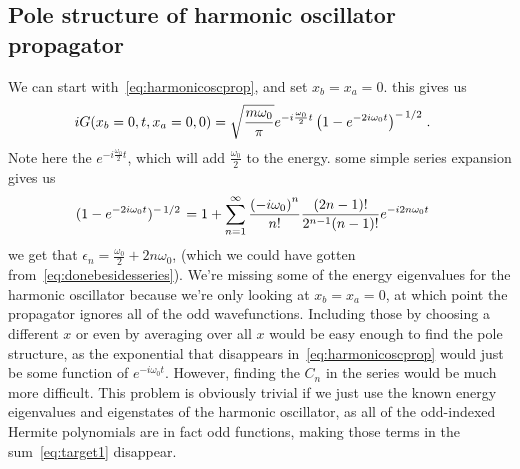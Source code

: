 \documentclass{article}
\begin{document}
	\subsection{Pole structure of harmonic oscillator propagator} \label{subsec:sol2}
	We can start with~\eqref{eq:harmonicoscprop}, and set $x_b = x_a = 0$.
	\triv this gives us
	\begin{align}
		i G(x_b = 0, t, x_a = 0, 0) &= \sqrt{\frac{m \omega_0}{\pi}} e^{-i\frac{\omega_0}{2} t}\left(1 - e^{- 2 i \omega_0 t}\right)^{-\flatfrac12}. \label{eq:donebesidesseries}
	\end{align}
	Note here the $e^{-i\frac{\omega_0}{2} t}$, which will add $\frac{\omega_0}{2}$ to the energy.
	\triv some simple series expansion gives us
	\begin{align}
		(1 - e^{- 2 i \omega_0 t})^{-\flatfrac12} &= 1 + \sum_{n = 1}^\infty \frac{ \left(- i \omega_0 \right)^n }{n{!}} \frac{(2n - 1){!}}{2^{n - 1}(n - 1){!}}e^{- i 2 n \omega_0 t}
	\end{align}
	\thrf we get that $\epsilon_n = \frac{\omega_0}{2} + 2 n \omega_0$, (which we could have gotten from~\eqref{eq:donebesidesseries}).
	We're missing some of the energy eigenvalues for the harmonic oscillator because we're only looking at $x_b = x_a = 0$, at which point the propagator ignores all of the odd wavefunctions.
	Including those by choosing a different $x$ or even by averaging over all $x$ would be easy enough to find the pole structure, as the exponential that disappears in~\eqref{eq:harmonicoscprop} would just be some function of $e^{-i\omega_0 t}$.
	However, finding the $C_n$ in the series would be much more difficult.
	This problem is obviously trivial if we just use the known energy eigenvalues and eigenstates of the harmonic oscillator, as all of the odd-indexed Hermite polynomials are in fact odd functions, making those terms in the sum~\eqref{eq:target1} disappear.
\end{document}
